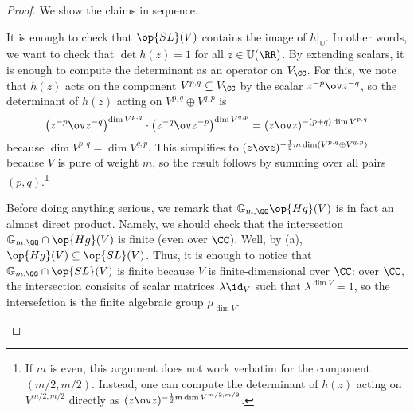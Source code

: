 \documentclass[../thesis.tex]{subfiles}
\begin{document}
\begin{proof}
	We show the claims in sequence.
	\begin{listalph}
		\item It is enough to check that $\op{SL}(V)$ contains the image of $h|_{\mathbb U}$. In other words, we want to check that $\det h(z)=1$ for all $z\in\mathbb U(\RR)$. By extending scalars, it is enough to compute the determinant as an operator on $V_\CC$. For this, we note that $h(z)$ acts on the component $V^{p,q}\subseteq V_\CC$ by the scalar $z^{-p}\ov z^{-q}$, so the determinant of $h(z)$ acting on $V^{p,q}\oplus V^{q,p}$ is
		\[\left(z^{-p}\ov z^{-q}\right)^{\dim V^{p,q}}\cdot\left(z^{-q}\ov z^{-p}\right)^{\dim V^{q,p}}=(z\ov z)^{-(p+q)\dim V^{p,q}}\]
		because $\dim V^{p,q}=\dim V^{q,p}$. This simplifies to $(z\ov z)^{-\frac12m\dim(V^{p,q}\oplus V^{q,p})}$ because $V$ is pure of weight $m$, so the result follows by summing over all pairs $(p,q)$.\footnote{If $m$ is even, this argument does not work verbatim for the component $(m/2,m/2)$. Instead, one can compute the determinant of $h(z)$ acting on $V^{m/2,m/2}$ directly as $(z\ov z)^{-\frac12m\dim V^{m/2,m/2}}$.}

		\item Before doing anything serious, we remark that $\mathbb G_{m,\QQ}\op{Hg}(V)$ is in fact an almost direct product. Namely, we should check that the intersection $\mathbb G_{m,\QQ}\cap\op{Hg}(V)$ is finite (even over $\CC$). Well, by (a), $\op{Hg}(V)\subseteq\op{SL}(V)$. Thus, it is enough to notice that $\mathbb G_{m,\QQ}\cap\op{SL}(V)$ is finite because $V$ is finite-dimensional over $\CC$: over $\CC$, the intersection consisits of scalar matrices $\lambda\id_V$ such that $\lambda^{\dim V}=1$, so the intersefction is the finite algebraic group $\mu_{\dim V}$.
		

\end{listalph}
\end{proof}
\end{document}
